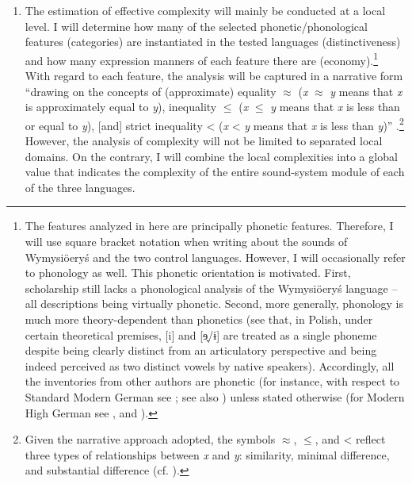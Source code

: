 \documentclass[output=paper,hidelinks]{langscibook}
\begin{document}
\begin{enumerate}
\item
The estimation of effective complexity will mainly be conducted at a local level. I will determine how many of the selected phonetic/phonological features (categories) are instantiated in the tested languages (distinctiveness) and how many expression manners of each feature there are (economy).\footnote{The features analyzed in here are principally phonetic features. Therefore, I will use square bracket notation when writing about the sounds of Wymysiöeryś and the two control languages. However, I will occasionally refer to phonology as well. This phonetic orientation is motivated. First, scholarship still lacks a phonological analysis of the Wymysiöeryś language – all descriptions being virtually phonetic. Second, more generally, phonology is much more theory-dependent than phonetics (see that, in Polish, under certain theoretical premises, [i] and [ɘ̟/ɨ] are treated as a single phoneme despite being clearly distinct from an articulatory perspective and being indeed perceived as two distinct vowels by native speakers). Accordingly, all the inventories from other authors are phonetic (for instance, with respect to Standard Modern German see \citealt{johnson_exploring_2008, fagan_german_2009, obrein_german_2016}; see also \citealt[352]{eisenberg_german_1994, dodd_modern_2003}) unless stated otherwise (for Modern High German see \citealt{russ_german_1994, wiese_phonology_1996}, and \citealt{fox_structure_2005}).} With regard to each feature, the analysis will be captured in a narrative form “drawing on the concepts of (approximate) equality ${\approx}$ (\textit{x} ${\approx}$ \textit{y} means that \textit{x} is approximately equal to \textit{y}), inequality ${\leq}$ (\textit{x} ${\leq}$ \textit{y} means that \textit{x} is less than or equal to \textit{y}), [and] strict inequality < (\textit{x} < \textit{y} means that \textit{x} is less than \textit{y})” \citep{Andrasonforthcoming}.\footnote{Given the narrative approach adopted, the symbols ${\approx}$, ${\leq}$, and < reflect three types of relationships between \textit{x} and \textit{y}: similarity, minimal difference, and substantial difference (cf. \citealt{Andrasonforthcoming}).} However, the analysis of complexity will not be limited to separated local domains. On the contrary, I will combine the local complexities into a global value that indicates the complexity of the entire sound-system module of each of the three languages. 
\end{enumerate}
\end{document}
